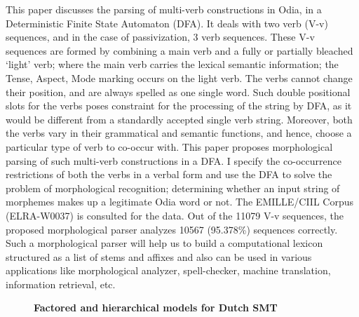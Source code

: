 \documentclass[10pt, a4paper, twopage, headinclude, footinclude, BCOR5mm]{scrartcl}
\begin{document}
\noindent
This paper discusses the parsing of multi-verb constructions in Odia, in a Deterministic Finite State Automaton (DFA).  It deals with two verb (V-v) sequences, and in the case of passivization, 3 verb sequences. These V-v sequences are formed by combining a main verb and a fully or partially bleached ‘light’ verb; where the main verb carries the lexical semantic information; the Tense, Aspect, Mode marking occurs on the light verb. The verbs cannot change their position, and are always spelled as one single word. Such double positional slots for the verbs poses constraint for the processing of the string by DFA, as it would be different from a standardly accepted single verb string. Moreover, both the verbs vary in their grammatical and semantic functions, and hence, choose a particular type of verb to co-occur with. This paper proposes morphological parsing of such multi-verb constructions in a DFA. I specify the co-occurrence restrictions of both the verbs in a verbal form and  use the DFA to solve the problem of morphological recognition; determining whether an input string of morphemes makes up a legitimate Odia word or not. The EMILLE/CIIL Corpus (ELRA-W0037) is consulted for the data.  Out of the 11079 V-v sequences, the proposed morphological parser analyzes 10567 (95.378\%) sequences correctly.  Such a morphological parser will help us to build a computational lexicon structured as a list of stems and affixes and also can be used in various applications like morphological analyzer,  spell-checker, machine translation, information retrieval, etc.


\newpage

\begin{figure}[t!]
\centering
\large\textbf{Factored and hierarchical models for Dutch SMT}
\vspace*{0.5cm}
\end{figure}


        \begin{table}[t!]
    \end{table}
\end{document}
